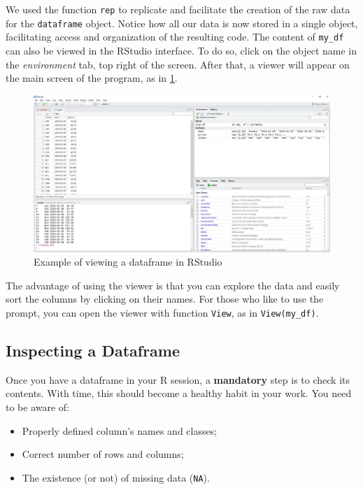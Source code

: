 \documentclass[
  12pt,
]{book}
\providecommand{\tightlist}{%
  \setlength{\itemsep}{0pt}\setlength{\parskip}{0pt}}
\begin{document}
We used the function \texttt{rep} to replicate and facilitate the creation of the raw data for the \texttt{dataframe} object. Notice how all our data is now stored in a single object, facilitating access and organization of the resulting code. The content of \texttt{my\_df} can also be viewed in the RStudio interface. To do so, click on the object name in the \emph{environment} tab, top right of the screen. After that, a viewer will appear on the main screen of the program, as in \ref{fig:example-view}. 

\begin{figure}[!htbp]

{\centering \includegraphics[width=1\linewidth]{figs/Command_view} 

}

\caption{Example of viewing a dataframe in RStudio}\label{fig:example-view}
\end{figure}

The advantage of using the viewer is that you can explore the data and easily sort the columns by clicking on their names. For those who like to use the prompt, you can open the viewer with function \texttt{View}, as in \texttt{View(my\_df)}. 

\hypertarget{inspecting-a-dataframe}{%
\subsection{Inspecting a Dataframe}\label{inspecting-a-dataframe}}

Once you have a dataframe in your R session, a \textbf{mandatory} step is to check its contents. With time, this should become a healthy habit in your work. You need to be aware of:

\begin{itemize}
\tightlist
\item
  Properly defined column's names and classes;
\item
  Correct number of rows and columns;
\item
  The existence (or not) of missing data (\texttt{NA}).
\end{itemize}
\end{document}
